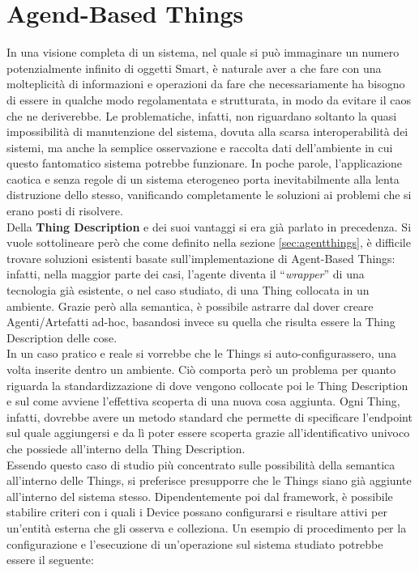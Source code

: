 \documentclass[12pt,a4paper,openright,oneside]{report}
\newcommand{\quotes}[1]{``#1''}
\begin{document}
\section{Agend-Based Things}
In una visione completa di un sistema, nel quale si può immaginare un numero potenzialmente infinito di oggetti Smart, è naturale aver a che fare con una molteplicità di informazioni e operazioni da fare che necessariamente ha bisogno di essere in qualche modo regolamentata e strutturata, in modo da evitare il caos che ne deriverebbe. Le problematiche, infatti, non riguardano soltanto la quasi impossibilità di manutenzione del sistema, dovuta alla scarsa interoperabilità dei sistemi, ma anche la semplice osservazione e raccolta dati dell'ambiente in cui questo fantomatico sistema potrebbe funzionare. In poche parole, l'applicazione caotica e senza regole di un sistema eterogeneo porta inevitabilmente alla lenta distruzione dello stesso, vanificando completamente le soluzioni ai problemi che si erano posti di risolvere.\\

Della \textbf{Thing Description} e dei suoi vantaggi si era già parlato in precedenza. Si vuole sottolineare però che come definito nella sezione \ref{sec:agentthings}, è difficile trovare soluzioni esistenti basate sull'implementazione di Agent-Based Things: infatti, nella maggior parte dei casi, l'agente diventa il \quotes{\textit{wrapper}} di una tecnologia già esistente, o nel caso studiato, di una Thing collocata in un ambiente. Grazie però alla semantica, è possibile astrarre dal dover creare Agenti/Artefatti ad-hoc, basandosi invece su quella che risulta essere la Thing Description delle cose.\\

In un caso pratico e reale si vorrebbe che le Things si auto-configurassero, una volta inserite dentro un ambiente. Ciò comporta però un problema per quanto riguarda la standardizzazione di dove vengono collocate poi le Thing Description e sul come avviene l'effettiva scoperta di una nuova cosa aggiunta. Ogni Thing, infatti, dovrebbe avere un metodo standard che permette di specificare l'endpoint sul quale aggiungersi e da lì poter essere scoperta grazie all'identificativo univoco che possiede all'interno della Thing Description.\\

Essendo questo caso di studio più concentrato sulle possibilità della semantica all'interno delle Things, si preferisce presupporre che le Things siano già aggiunte all'interno del sistema stesso. Dipendentemente poi dal framework, è possibile stabilire criteri con i quali i Device possano configurarsi e risultare attivi per un'entità esterna che gli osserva e colleziona. Un esempio di procedimento per la configurazione e l'esecuzione di un'operazione sul sistema studiato potrebbe essere il seguente:
\end{document}
